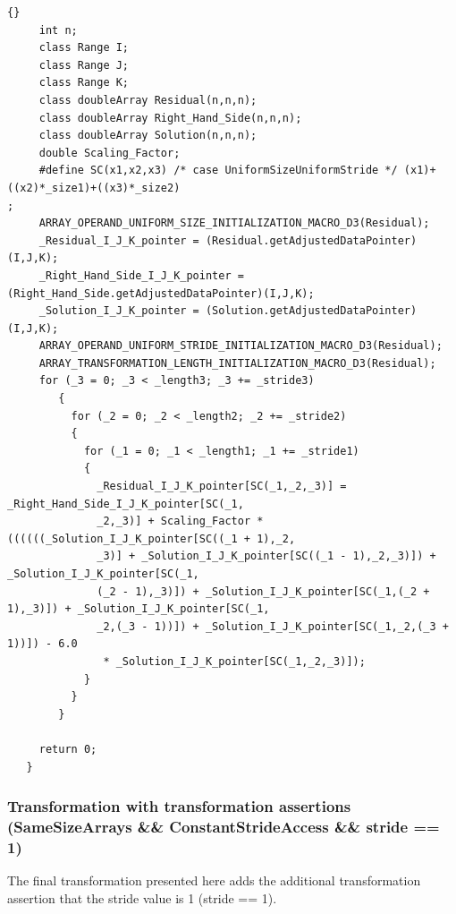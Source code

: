 \documentclass[10pt]{article}
\begin{document}
{\begin{lstlisting}{}
     int n;
     class Range I;
     class Range J;
     class Range K;
     class doubleArray Residual(n,n,n);
     class doubleArray Right_Hand_Side(n,n,n);
     class doubleArray Solution(n,n,n);
     double Scaling_Factor; 
     #define SC(x1,x2,x3) /* case UniformSizeUniformStride */ (x1)+((x2)*_size1)+((x3)*_size2)
; 
     ARRAY_OPERAND_UNIFORM_SIZE_INITIALIZATION_MACRO_D3(Residual); 
     _Residual_I_J_K_pointer = (Residual.getAdjustedDataPointer)(I,J,K); 
     _Right_Hand_Side_I_J_K_pointer = (Right_Hand_Side.getAdjustedDataPointer)(I,J,K); 
     _Solution_I_J_K_pointer = (Solution.getAdjustedDataPointer)(I,J,K); 
     ARRAY_OPERAND_UNIFORM_STRIDE_INITIALIZATION_MACRO_D3(Residual); 
     ARRAY_TRANSFORMATION_LENGTH_INITIALIZATION_MACRO_D3(Residual); 
     for (_3 = 0; _3 < _length3; _3 += _stride3)
        { 
          for (_2 = 0; _2 < _length2; _2 += _stride2)
          { 
            for (_1 = 0; _1 < _length1; _1 += _stride1)
            { 
              _Residual_I_J_K_pointer[SC(_1,_2,_3)] = _Right_Hand_Side_I_J_K_pointer[SC(_1,
              _2,_3)] + Scaling_Factor * ((((((_Solution_I_J_K_pointer[SC((_1 + 1),_2,
              _3)] + _Solution_I_J_K_pointer[SC((_1 - 1),_2,_3)]) + _Solution_I_J_K_pointer[SC(_1,
              (_2 - 1),_3)]) + _Solution_I_J_K_pointer[SC(_1,(_2 + 1),_3)]) + _Solution_I_J_K_pointer[SC(_1,
              _2,(_3 - 1))]) + _Solution_I_J_K_pointer[SC(_1,_2,(_3 + 1))]) - 6.0
               * _Solution_I_J_K_pointer[SC(_1,_2,_3)]); 
            } 
          } 
        } 

     return 0;
   } 

\end{lstlisting}
}


\subsubsection{Transformation with transformation assertions (SameSizeArrays \&\& ConstantStrideAccess \&\& stride == 1)}

   The final transformation presented here adds the additional transformation assertion that the
stride value is 1 (stride == 1).
\end{document}
